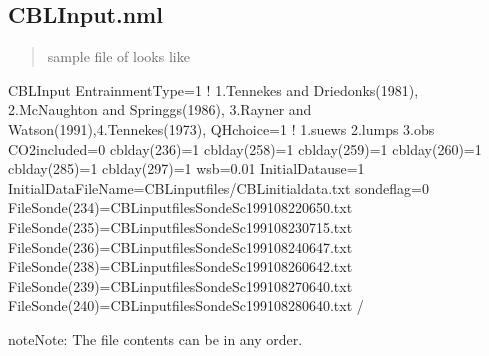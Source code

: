 \documentclass[letterpaper,10pt,english]{sphinxmanual}
\begin{document}
\subsection{CBLInput.nml}
\label{\detokenize{input_files/CBL_input/CBL_input:id5}}\label{\detokenize{input_files/CBL_input/CBL_input:cblinput-nml}}\begin{quote}

sample file of  looks like
\end{quote}

%
\begin{sphinxVerbatim}[commandchars=\\\{\}]
\PYGZam{}CBLInput
EntrainmentType=1       ! 1.Tennekes and Driedonks(1981), 2.McNaughton and Springgs(1986), 3.Rayner and Watson(1991),4.Tennekes(1973),
QH\PYGZus{}choice=1             ! 1.suews  2.lumps 3.obs
CO2\PYGZus{}included=0
cblday(236)=1
cblday(258)=1
cblday(259)=1
cblday(260)=1
cblday(285)=1
cblday(297)=1
wsb=\PYGZhy{}0.01  
InitialData\PYGZus{}use=1
InitialDataFileName=\PYGZsq{}CBLinputfiles/CBL\PYGZus{}initial\PYGZus{}data.txt\PYGZsq{}
sondeflag=0
FileSonde(234)=\PYGZsq{}CBLinputfiles\PYGZbs{}Sonde\PYGZus{}Sc\PYGZus{}1991\PYGZus{}0822\PYGZus{}0650.txt\PYGZsq{}
FileSonde(235)=\PYGZsq{}CBLinputfiles\PYGZbs{}Sonde\PYGZus{}Sc\PYGZus{}1991\PYGZus{}0823\PYGZus{}0715.txt\PYGZsq{}
FileSonde(236)=\PYGZsq{}CBLinputfiles\PYGZbs{}Sonde\PYGZus{}Sc\PYGZus{}1991\PYGZus{}0824\PYGZus{}0647.txt\PYGZsq{}
FileSonde(238)=\PYGZsq{}CBLinputfiles\PYGZbs{}Sonde\PYGZus{}Sc\PYGZus{}1991\PYGZus{}0826\PYGZus{}0642.txt\PYGZsq{}
FileSonde(239)=\PYGZsq{}CBLinputfiles\PYGZbs{}Sonde\PYGZus{}Sc\PYGZus{}1991\PYGZus{}0827\PYGZus{}0640.txt\PYGZsq{}
FileSonde(240)=\PYGZsq{}CBLinputfiles\PYGZbs{}Sonde\PYGZus{}Sc\PYGZus{}1991\PYGZus{}0828\PYGZus{}0640.txt\PYGZsq{}
/
\end{sphinxVerbatim}

\begin{sphinxadmonition}{note}{Note:}
The file contents can be in any order.
\end{sphinxadmonition}
\end{document}
